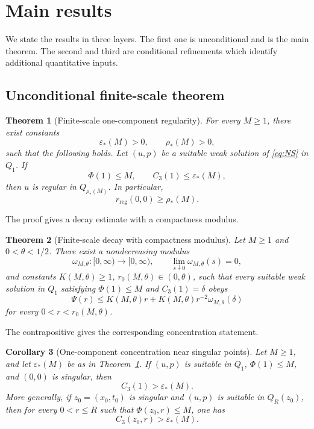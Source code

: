 \documentclass[pdflatex,sn-mathphys-num]{sn-jnl}
\numberwithin{equation}{section}
\theoremstyle{thmstyleone}
\newtheorem{theorem}{Theorem}[section]
\newtheorem{corollary}[theorem]{Corollary}
\theoremstyle{thmstylethree}
\newcommand{\eps}{\varepsilon}
\newcommand{\reg}{\mathrm{reg}}
\begin{document}
\section{Main results}
\label{sec:main-results}

We state the results in three layers.  The first one is unconditional and is the main theorem.  The second and third are conditional refinements which identify additional quantitative inputs.

\subsection{Unconditional finite-scale theorem}

\begin{theorem}[Finite-scale one-component regularity]
\label{thm:finite-scale-main}
For every \(M\ge1\), there exist constants
\[
        \eps_*(M)>0,
        \qquad
        \rho_*(M)>0,
\]
such that the following holds.  Let \((u,p)\) be a suitable weak solution of \eqref{eq:NS} in \(Q_1\).  If
\[
        \Phi(1)\le M,
        \qquad
        C_3(1)\le \eps_*(M),
\]
then \(u\) is regular in \(Q_{\rho_*(M)}\).  In particular,
\[
        r_{\reg}(0,0)\ge \rho_*(M).
\]
\end{theorem}

The proof gives a decay estimate with a compactness modulus.

\begin{theorem}[Finite-scale decay with compactness modulus]
\label{thm:compactness-decay}
Let \(M\ge1\) and \(0<\theta<1/2\).  There exist a nondecreasing modulus
\[
        \omega_{M,\theta}:[0,\infty)\to[0,\infty),
        \qquad
        \lim_{s\downarrow0}\omega_{M,\theta}(s)=0,
\]
and constants \(K(M,\theta)\ge1\), \(r_0(M,\theta)\in(0,\theta)\), such that every suitable weak solution in \(Q_1\) satisfying \(\Phi(1)\le M\) and \(C_3(1)=\delta\) obeys
\begin{equation}
        \Psi(r)
        \le K(M,\theta)r+K(M,\theta)r^{-2}\omega_{M,\theta}(\delta)
        \label{eq:compact-decay-main}
\end{equation}
for every \(0<r<r_0(M,\theta)\).
\end{theorem}

The contrapositive gives the corresponding concentration statement.

\begin{corollary}[One-component concentration near singular points]
\label{cor:concentration}
Let \(M\ge1\), and let \(\eps_*(M)\) be as in Theorem~\ref{thm:finite-scale-main}.  If \((u,p)\) is suitable in \(Q_1\), \(\Phi(1)\le M\), and \((0,0)\) is singular, then
\[
        C_3(1)>\eps_*(M).
\]
More generally, if \(z_0=(x_0,t_0)\) is singular and \((u,p)\) is suitable in \(Q_R(z_0)\), then for every \(0<r\le R\) such that \(\Phi(z_0,r)\le M\), one has
\[
        C_3(z_0,r)>\eps_*(M).
\]
\end{corollary}
\end{document}
